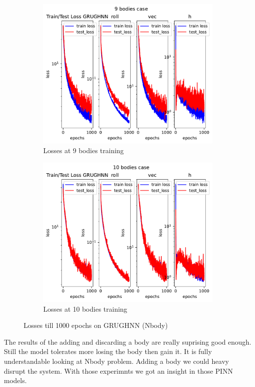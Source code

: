 \begin{figure}[H]
	\centering
	\begin{subfigure}[b]{0.4\textwidth}
		\centering
		\includegraphics[width=\textwidth]{chapters/chapter5/loss_9.pdf}
		\caption{Losses at 9 bodies training}
	\end{subfigure}
	\hfill
	\begin{subfigure}[b]{0.4\textwidth}
		\centering
		\includegraphics[width=\textwidth]{chapters/chapter5/loss_10.pdf}
		\caption{Losses at 10 bodies training}
	\end{subfigure}
	
	
	\caption{Losses till 1000 epochs on GRUGHNN (Nbody)}
	\label{fig_traj}
\end{figure}

The results of the adding and discarding a body are really suprising good enough. Still the model tolerates more losing the body then gain it. It is fully understandable looking at Nbody problem. Adding a body we could heavy disrupt the system.
With those experimnts we got an insight in those PINN models.